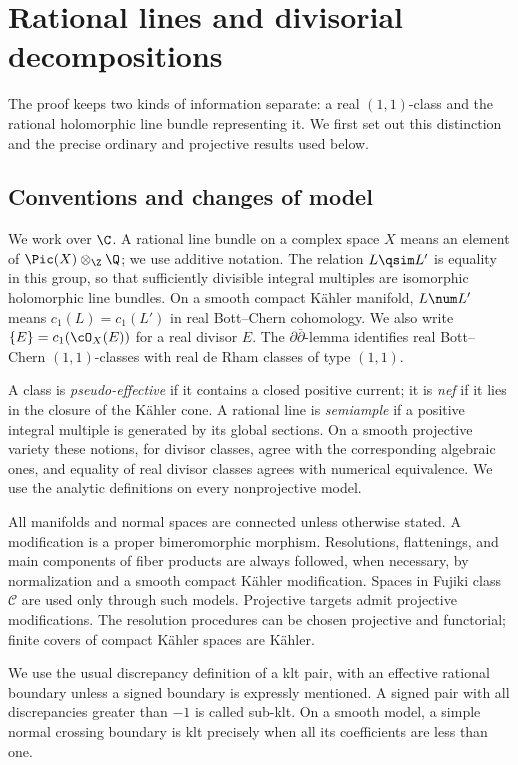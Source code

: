 \section{Rational lines and divisorial decompositions}\label{sec:preliminaries}

The proof keeps two kinds of information separate: a real \((1,1)\)-class
and the rational holomorphic line bundle representing it. We first set
out this distinction and the precise ordinary and projective results used
below.

\subsection{Conventions and changes of model}

We work over \(\C\). A rational line bundle on a complex space \(X\) means
an element of \(\Pic(X)\otimes_{\Z}\Q\); we use additive notation.
The relation \(L\qsim L'\) is equality in this group, so that sufficiently
divisible integral multiples are isomorphic holomorphic line bundles.
On a smooth compact K\"ahler manifold, \(L\num L'\) means
\(c_1(L)=c_1(L')\) in real Bott--Chern cohomology. We also write
\(\{E\}=c_1(\cO_X(E))\) for a real divisor \(E\).
The \(\partial\bar\partial\)-lemma identifies real Bott--Chern
\((1,1)\)-classes with real de Rham classes of type \((1,1)\).

A class is \emph{pseudo-effective} if it contains a closed positive current;
it is \emph{nef} if it lies in the closure of the K\"ahler cone.
A rational line is \emph{semiample} if a positive integral multiple is
generated by its global sections. On a smooth projective variety these
notions, for divisor classes, agree with the corresponding algebraic
ones, and equality of real divisor classes agrees with numerical
equivalence. We use the analytic definitions on every nonprojective
model.

All manifolds and normal spaces are connected unless otherwise stated.
A modification is a proper bimeromorphic morphism. Resolutions,
flattenings, and main components of fiber products are always followed,
when necessary, by normalization and a smooth compact K\"ahler
modification. Spaces in Fujiki class \(\mathcal C\) are used only through
such models. Projective targets admit projective modifications. The
resolution procedures can be chosen projective and functorial; finite
covers of compact K\"ahler spaces are K\"ahler.

We use the usual discrepancy definition of a klt pair, with an effective
rational boundary unless a signed boundary is expressly mentioned.
A signed pair with all discrepancies greater than \(-1\) is called
sub-klt. On a smooth model, a simple normal crossing boundary is klt
precisely when all its coefficients are less than one.

